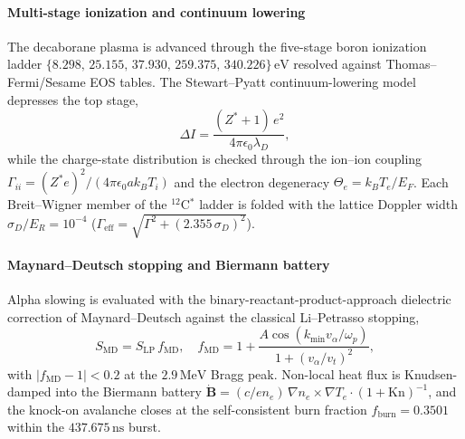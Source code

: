 \documentclass[11pt,journal,compsoc]{IEEEtran}
\begin{document}
\paragraph{Multi-stage ionization and continuum lowering}
The decaborane plasma is advanced through the five-stage boron
ionization ladder $\{8.298,\,25.155,\,37.930,\,259.375,\,340.226\}\,
\mathrm{eV}$ resolved against Thomas--Fermi/Sesame EOS tables. The
Stewart--Pyatt continuum-lowering model depresses the top stage,
\begin{equation}
\Delta I = \frac{(Z^{*}+1)\,e^{2}}{4\pi\epsilon_0\lambda_D},
\label{eq:stewart}
\end{equation}
while the charge-state distribution is checked through the ion--ion
coupling $\Gamma_{ii} = (Z^{*}e)^2/(4\pi\epsilon_0 a k_B T_i)$ and the
electron degeneracy $\Theta_e = k_B T_e/E_F$. Each Breit--Wigner member
of the $^{12}$C$^{*}$ ladder is folded with the lattice Doppler width
$\sigma_D/E_R = 10^{-4}$ ($\Gamma_{\mathrm{eff}} =
\sqrt{\Gamma^2 + (2.355\,\sigma_D)^2}$).
\paragraph{Maynard--Deutsch stopping and Biermann battery}
Alpha slowing is evaluated with the binary-reactant-product-approach
dielectric correction of Maynard--Deutsch against the classical
Li--Petrasso stopping,
\begin{equation}
S_{\mathrm{MD}} = S_{\mathrm{LP}}\,f_{\mathrm{MD}},\quad
f_{\mathrm{MD}} = 1 + \frac{A\cos(k_{\min}v_\alpha/\omega_p)}
{1 + (v_\alpha/v_t)^2},
\label{eq:md}
\end{equation}
with $|f_{\mathrm{MD}} - 1| < 0.2$ at the $2.9\,\mathrm{MeV}$ Bragg
peak. Non-local heat flux is Knudsen-damped into the Biermann battery
$\dot{\mathbf{B}} = (c/e n_e)\,\nabla n_e \times \nabla T_e \cdot
(1+\mathrm{Kn})^{-1}$, and the knock-on avalanche closes at the
self-consistent burn fraction $f_{\mathrm{burn}} = 0.3501$ within the
$437.675\,\mathrm{ns}$ burst.
\end{document}
